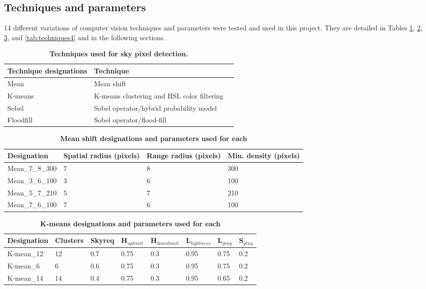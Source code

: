 \documentclass[final,3p,times,authoryear]{elsarticle}
\begin{document}
\subsection{Techniques and parameters}
14 different variations of computer vision techniques and parameters were tested and used in this project. They are detailed in Tables \ref{tab:techniques}, \ref{tab:techniques2}, \ref{tab:techniques3}, and \ref{tab:techniques4} and in the following sections.

\begin{table}[!htbp]
\caption{\bf Techniques used for sky pixel detection.  \label{tab:techniques}}     
\begin{tabular}{ l  l l}
\textbf{Technique designations} & \textbf{Technique}  \\ \hline
Mean &  Mean shift \\
K-means  & K-means clustering and HSL color filtering \\
Sobel  & Sobel operator/hybrid probability model \\	
Floodfill  & Sobel operator/flood-fill \\
\hline
\end{tabular}
\end{table}


\begin{table}[!htbp]
\caption{\bf Mean shift designations and parameters used for each \label{tab:techniques2}}     
\begin{tabular}{ l  l  l l}
\textbf{Designation}  & \textbf{Spatial radius (pixels)}&\textbf{Range radius (pixels)}&\textbf{Min. density (pixels)}   \\ \hline
Mean\_7\_8\_300 & 7 & 8& 300 \\
Mean\_3\_6\_100	 & 3& 6& 100 \\
Mean\_5\_7\_210	 & 5& 7& 210 \\	 
Mean\_7\_6\_100	 & 7& 6& 100 \\

\hline
\end{tabular}
\end{table}

\begin{table}[!htbp]
\caption{\bf K-means designations and parameters used for each \label{tab:techniques3}}     
\begin{tabular}{ l l l l l l l l}
\textbf{Designation} & \textbf{Clusters} & \textbf{Skyreq}&\textbf{H$_{uplimit}$}&\textbf{H$_{downlimit}$} & \textbf{L$_{lightness}$} & \textbf{L$_{gray}$}& \textbf{S$_{gray}$} \\ \hline
K-mean\_12  & 12 & 0.7& 0.75& 0.3 & 0.95 & 0.75 & 0.2 \\
K-mean\_6  & 6 & 0.6& 0.75& 0.3 & 0.95 & 0.75 & 0.2 \\
K-mean\_14  & 14 & 0.4& 0.75& 0.3 & 0.95 & 0.65 & 0.2 \\
\hline
\end{tabular}
\end{table}
\end{document}
